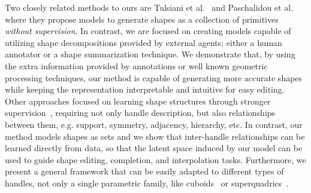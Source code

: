 Two closely related methods to ours are Tulsiani et al.~\cite{Tulsiani2017} and Paschalidou et al.~\cite{Paschalidou2019} where they propose models
to generate shapes as a collection of primitives \emph{without supervision}.
In contrast, we are focused
on creating models capable of utilizing shape decompositions provided by external
agents; either a human annotator or a shape summarization technique.
We demonstrate that, by using the extra information provided by annotations or well known
geometric processing techniques, our method is capable of generating
more accurate shapes while keeping the representation interpretable and intuitive for easy
editing.
Other approaches focused on learning shape structures through stronger 
supervision~\cite{li_sig17, mo2019structurenet, im2struct}, requiring not only handle description,
but also relationships between them, e.g. support, symmetry, adjacency, hierarchy, etc.
In contrast, our method models shapes as sets and we show that inter-handle relationships
can be learned directly from data, so that the latent space induced by our model can be used to guide shape editing, completion, and interpolation tasks.
Furthermore, we present a general framework that can be easily adapted to different types of handles,
not only a single parametric family, like cuboids~\cite{Tulsiani2017, mo2019structurenet, li_sig17} or superquadrics~\cite{Paschalidou2019}.

